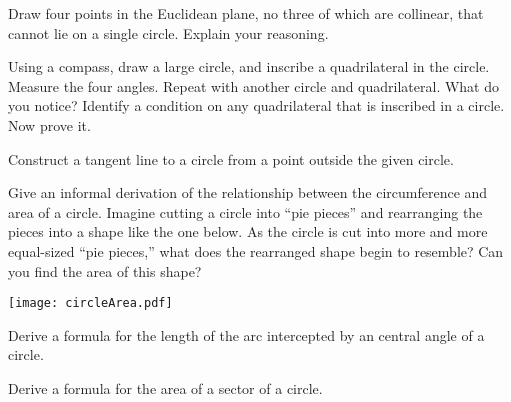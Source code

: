 \documentclass[nooutcomes]{ximera}
\begin{document}
\begin{problem}
Draw four points in the Euclidean plane, no three of which are collinear, that cannot lie on a single circle.  Explain your reasoning. 
\vfill
\end{problem}

\newpage
\begin{problem}
Using a compass, draw a large circle, and inscribe a quadrilateral in the circle.  Measure the four angles.  Repeat with another circle and quadrilateral.  What do you notice?  Identify a condition on any quadrilateral that is inscribed in a circle.  Now prove it.  
\vfill
\end{problem}

\begin{problem}
Construct a tangent line to a circle from a point outside the given circle.
\begin{image}
\end{image}
\end{problem}

\newpage
\begin{problem}
Give an informal derivation of the relationship between the circumference and area of a circle.  Imagine cutting a circle into ``pie pieces'' and rearranging the pieces into a shape like the one below.  As the circle is cut into more and more equal-sized ``pie pieces,'' what does the rearranged shape begin to resemble?  Can you find the area of this shape?  
\begin{image}
\texttt{[image: circleArea.pdf]}
\end{image}
\vfill
\end{problem}

\newpage
\begin{problem}
Derive a formula for the length of the arc intercepted by an central angle of a circle.  
\vfill
\end{problem}

\begin{problem}
Derive a formula for the area of a sector of a circle.  
\vfill
\end{problem}

\end{document}
